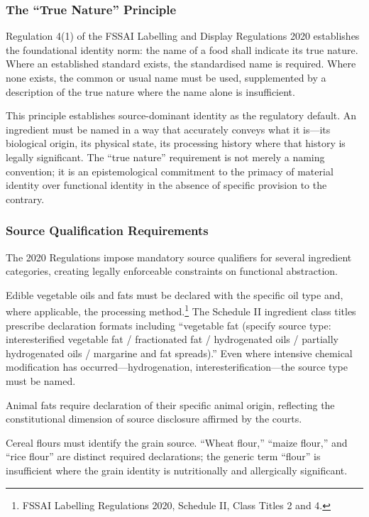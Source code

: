 \documentclass[12pt,a3paper]{article}
\begin{document}
\subsubsection{The ``True Nature'' Principle}

Regulation 4(1) of the FSSAI Labelling and Display Regulations 2020 establishes the foundational identity norm: the name of a food shall indicate its true nature. Where an established standard exists, the standardised name is required. Where none exists, the common or usual name must be used, supplemented by a description of the true nature where the name alone is insufficient.

This principle establishes source-dominant identity as the regulatory default. An ingredient must be named in a way that accurately conveys what it is---its biological origin, its physical state, its processing history where that history is legally significant. The ``true nature'' requirement is not merely a naming convention; it is an epistemological commitment to the primacy of material identity over functional identity in the absence of specific provision to the contrary.

\subsubsection{Source Qualification Requirements}

The 2020 Regulations impose mandatory source qualifiers for several ingredient categories, creating legally enforceable constraints on functional abstraction.

Edible vegetable oils and fats must be declared with the specific oil type and, where applicable, the processing method.\footnote{FSSAI Labelling Regulations 2020, Schedule II, Class Titles 2 and 4.} The Schedule II ingredient class titles prescribe declaration formats including ``vegetable fat (specify source type: interesterified vegetable fat / fractionated fat / hydrogenated oils / partially hydrogenated oils / margarine and fat spreads).'' Even where intensive chemical modification has occurred---hydrogenation, interesterification---the source type must be named.

Animal fats require declaration of their specific animal origin, reflecting the constitutional dimension of source disclosure affirmed by the courts.

Cereal flours must identify the grain source. ``Wheat flour,'' ``maize flour,'' and ``rice flour'' are distinct required declarations; the generic term ``flour'' is insufficient where the grain identity is nutritionally and allergically significant.
\end{document}
